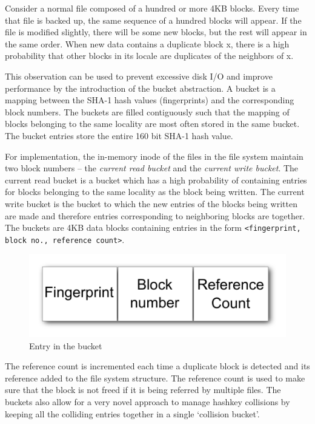 \documentclass[final]{ols}
\begin{document}
Consider a normal file composed of a hundred or more 4KB blocks. Every time that file is backed up, the same sequence of a hundred blocks will appear. If the file is modified slightly, there will be some new blocks, but the rest will appear in the same order. When new data contains a duplicate block x, there is a high probability that other blocks in its locale are duplicates of the neighbors of x. 

This observation can be used to prevent excessive disk I/O and improve performance by the introduction of the bucket abstraction. A bucket is a mapping between the SHA-1 hash values (fingerprints) and the corresponding block numbers. The buckets are filled contiguously such that the mapping of blocks belonging to the same locality are most often stored in the same bucket. The bucket entries store the entire 160 bit SHA-1 hash value.

For implementation, the in-memory inode of the files in the file system maintain two block numbers -- the \textit{current read bucket} and the \textit{current write bucket}. The current read bucket is a bucket which has a high probability of containing entries for blocks belonging to the same locality as the block being written. The current write bucket is the bucket to which the new entries of the blocks being written are made and therefore entries corresponding to neighboring blocks are together. The buckets are 4KB data blocks containing entries in the form \texttt{<fingerprint, block no., reference count>}. 

\begin{figure}[H]
\begin{center}
\includegraphics[width=0.7\columnwidth]{images/bucket_entry}
\caption{Entry in the bucket}  
\end{center}
\end{figure}

The reference count is incremented each time a duplicate block is detected and its reference added to the file system structure. The reference count is used to make sure that the block is not freed if it is being referred by multiple files. 
The buckets also allow for a very novel approach to manage hashkey collisions by keeping all the colliding entries together in a single `collision bucket'.
\end{document}

